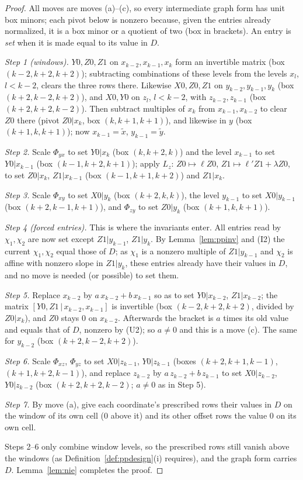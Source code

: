 \documentclass[11pt]{amsart}
\theoremstyle{definition}
\theoremstyle{plain}
\begin{document}
\begin{proof}
All moves are moves (a)--(c), so every intermediate graph form has unit box minors; each pivot below is nonzero because, given the entries already normalized, it is a box minor or a quotient of two (box in brackets). An entry is \emph{set} when it is made equal to its value in $D$.

\emph{Step 1 (windows).} $Y0,Z0,Z1$ on $x_{k-2},x_{k-1},x_k$ form an invertible matrix (box $(k-2,k+2,k+2)$); subtracting combinations of these levels from the levels $x_l$, $l<k-2$, clears the three rows there. Likewise $X0,Z0,Z1$ on $y_{k-2},y_{k-1},y_k$ (box $(k+2,k-2,k+2)$), and $X0,Y0$ on $z_l$, $l<k-2$, with $z_{k-2},z_{k-1}$ (box $(k+2,k+2,k-2)$). Then subtract multiples of $x_k$ from $x_{k-1},x_{k-2}$ to clear $Z0$ there (pivot $Z0|x_k$, box $(k,k+1,k+1)$), and likewise in $y$ (box $(k+1,k,k+1)$); now $x_{k-1}=\tilde x$, $y_{k-1}=\tilde y$.

\emph{Step 2.} Scale $\Phi_{yx}$ to set $Y0|x_k$ (box $(k,k+2,k)$) and the level $x_{k-1}$ to set $Y0|x_{k-1}$ (box $(k-1,k+2,k+1)$); apply $L_z$: $Z0\mapsto\ell Z0$, $Z1\mapsto\ell'Z1+\lambda Z0$, to set $Z0|x_k$, $Z1|x_{k-1}$ (box $(k-1,k+1,k+2)$) and $Z1|x_k$.

\emph{Step 3.} Scale $\Phi_{xy}$ to set $X0|y_k$ (box $(k+2,k,k)$), the level $y_{k-1}$ to set $X0|y_{k-1}$ (box $(k+2,k-1,k+1)$), and $\Phi_{zy}$ to set $Z0|y_k$ (box $(k+1,k,k+1)$).

\emph{Step 4 (forced entries).} This is where the invariants enter. All entries read by $\chi_1,\chi_2$ are now set except $Z1|y_{k-1}$, $Z1|y_k$. By Lemma~\ref{lem:ppinv} and (I2) the current $\chi_1,\chi_2$ equal those of $D$; as $\chi_1$ is a nonzero multiple of $Z1|y_{k-1}$ and $\chi_2$ is affine with nonzero slope in $Z1|y_k$, these entries already have their values in $D$, and no move is needed (or possible) to set them.

\emph{Step 5.} Replace $x_{k-2}$ by $a\,x_{k-2}+b\,x_{k-1}$ so as to set $Y0|x_{k-2}$, $Z1|x_{k-2}$; the matrix $[Y0,Z1\,|\allowbreak\,x_{k-2},x_{k-1}]$ is invertible (box $(k-2,k+2,k+2)$, divided by $Z0|x_k$), and $Z0$ stays $0$ on $x_{k-2}$. Afterwards the bracket is $a$ times its old value and equals that of $D$, nonzero by (U2); so $a\ne0$ and this is a move (c). The same for $y_{k-2}$ (box $(k+2,k-2,k+2)$).

\emph{Step 6.} Scale $\Phi_{xz}$, $\Phi_{yz}$ to set $X0|z_{k-1}$, $Y0|z_{k-1}$ (boxes $(k+2,k+1,k-1)$, $(k+1,k+2,k-1)$), and replace $z_{k-2}$ by $a\,z_{k-2}+b\,z_{k-1}$ to set $X0|z_{k-2}$, $Y0|z_{k-2}$ (box $(k+2,k+2,k-2)$; $a\ne0$ as in Step 5).

\emph{Step 7.} By move (a), give each coordinate's prescribed rows their values in $D$ on the window of its own cell ($0$ above it) and its other offset rows the value $0$ on its own cell.

Steps 2--6 only combine window levels, so the prescribed rows still vanish above the windows (as Definition~\ref{def:ppdesign}(i) requires), and the graph form carries $D$. Lemma~\ref{lem:nie} completes the proof.
\end{proof}
\end{document}
